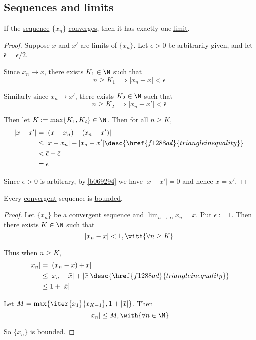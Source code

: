 \subsection{Sequences and limits}\label{d9acddb}

\label{e6b43e0}

If the \href{b5fa0e4}{sequence} $\{x_n\}$ \href{de3e28a}{converges}, then it
has exactly one \href{e565120}{limit}.

\begin{proof}
  Suppose $x$ and $x'$ are limits of $\{x_n\}$. Let $\epsilon>0$ be
  arbitrarily given, and let $\bar\epsilon=\epsilon/2$.

  Since $x_n\to x$, there exists $K_1\in\N$ such that
  $$
    n\geq K_1\implies |x_n-x|<\bar\epsilon
  $$

  Similarly since $x_n\to x'$, there exists $K_2\in\N$ such that
  $$
    n\geq K_2\implies |x_n-x'|<\bar\epsilon
  $$

  Then let $K:=\max\{K_1,K_2\}\in\N$. Then for all $n\geq K$,
  \begin{align*}
    |x-x'| &= |(x-x_n)-(x_n-x')|                                           \\
           &\leq|x-x_n|-|x_n-x'|\desc{\href{f1288ad}{triangle inequality}} \\
           &<\bar\epsilon+\bar\epsilon                                     \\
           &=\epsilon
  \end{align*}

  Since $\epsilon>0$ is arbitrary, by \autoref{b069294} we have $|x-x'|=0$ and
  hence $x=x'$.
\end{proof}

\label{d8148e6}

Every \href{de3e28a}{convergent} sequence is \href{d5ed299}{bounded}.

\begin{proof}
  Let $\{x_n\}$ be a convergent sequence and $\lim_{n\to\infty}x_n=\bar x$. Put
  $\epsilon:=1$. Then there exists $K\in\N$ such that
  $$
    |x_n-\bar x|<1,\with{\forall n\geq K}
  $$

  Thus when $n\geq K$,
  \begin{align*}
    |x_n| &= |(x_n-\bar x)+\bar x|                                             \\
          &\leq|x_n-\bar x|+|\bar x|\desc{\href{f1288ad}{triangle inequality}} \\
          &\leq1+|\bar x|
  \end{align*}

  Let $M=\max\{\iter{x_1}{x_{K-1}},1+|\bar x|\}$. Then
  $$
    |x_n|\leq M,\with{\forall n\in\N}
  $$

  So $\{x_n\}$ is bounded.
\end{proof}

